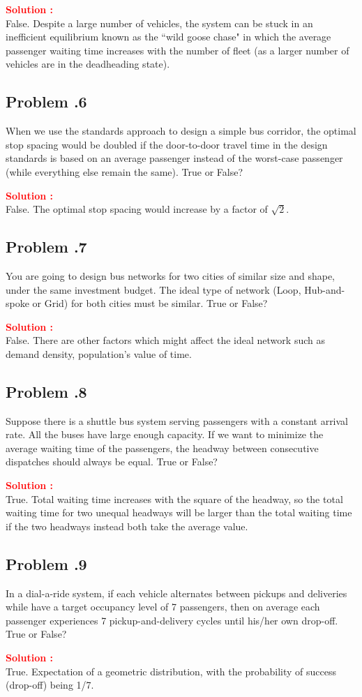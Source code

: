 \documentclass[12pt]{article}
\newcommand{\customsubsection}[1]{
  \subsection*{Problem \thesection.#1}
}
\begin{document}
\textbf{\textcolor{red}{Solution :}} \\
False. Despite a large number of vehicles, the system can be stuck in an inefficient equilibrium known as the ``wild goose chase" in which the average passenger waiting time increases with the number of fleet (as a larger number of vehicles are in the deadheading state).
\newpage

\customsubsection{6}
When we use the standards approach to design a simple bus corridor, the optimal stop spacing would be doubled if the door-to-door travel time in the design standards is based on an average passenger instead of the worst-case passenger (while everything else remain the same). True or False?


\textbf{\textcolor{red}{Solution :}} \\
False. The optimal stop spacing would increase by a factor of $\sqrt{2}$.
\newpage

\customsubsection{7}
You are going to design bus networks for two cities of similar size and shape, under the same investment budget. The ideal type of network (Loop, Hub-and-spoke or Grid) for both cities must be similar. True or False?


\textbf{\textcolor{red}{Solution :}} \\
False. There are other factors which might affect the ideal network such as demand density, population's value of time.
\newpage

\customsubsection{8}
Suppose there is a shuttle bus system serving passengers with a constant arrival rate. All the buses have large enough capacity. If we want to minimize the average waiting time of the passengers, the headway between consecutive dispatches should always be equal. True or False?


\textbf{\textcolor{red}{Solution :}} \\
True. Total waiting time increases with the square of the headway, so the total waiting time for two unequal headways will be larger than the total waiting time if the two headways instead both take the average value.
\newpage

\customsubsection{9}
In a dial-a-ride system, if each vehicle alternates between pickups and deliveries while have a target occupancy level of 7 passengers, then on average each passenger experiences 7 pickup-and-delivery cycles until his/her own drop-off. True or False?


\textbf{\textcolor{red}{Solution :}} \\
True. Expectation of a geometric distribution, with the probability of success (drop-off) being 1/7.
\newpage
\end{document}
